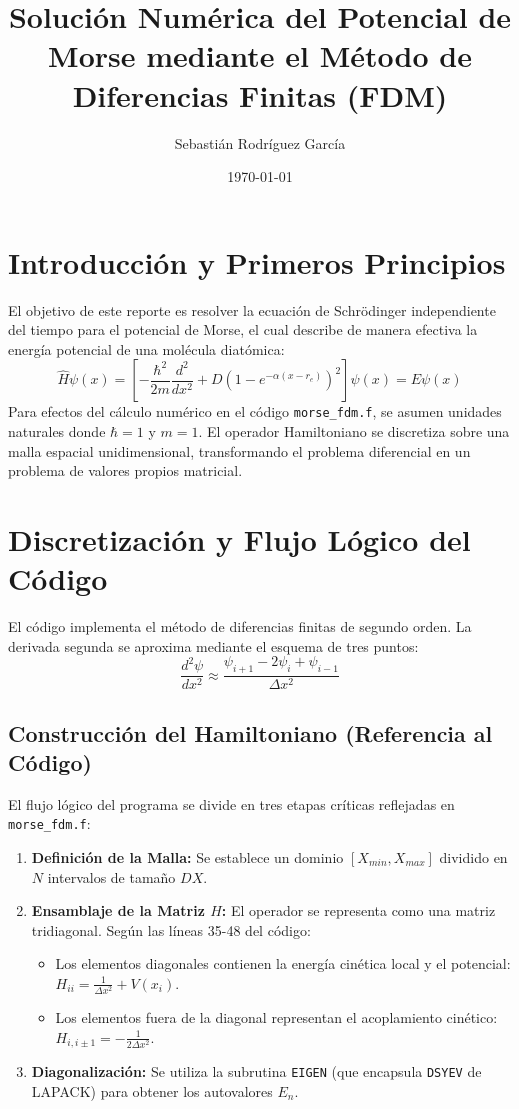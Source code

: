 \documentclass[12pt,a4paper]{article}
\title{Solución Numérica del Potencial de Morse mediante el Método de Diferencias Finitas (FDM)}
\author{Sebastián Rodríguez García}
\date{\today}
\begin{document}
\maketitle

\section{Introducción y Primeros Principios}
El objetivo de este reporte es resolver la ecuación de Schrödinger independiente del tiempo para el potencial de Morse, el cual describe de manera efectiva la energía potencial de una molécula diatómica:
\begin{equation}
\hat{H}\psi(x) = \left[ -\frac{\hbar^2}{2m}\frac{d^2}{dx^2} + D(1 - e^{-\alpha(x-r_e)})^2 \right]\psi(x) = E\psi(x)
\end{equation}
Para efectos del cálculo numérico en el código \texttt{morse\_fdm.f}, se asumen unidades naturales donde $\hbar = 1$ y $m = 1$. El operador Hamiltoniano se discretiza sobre una malla espacial unidimensional, transformando el problema diferencial en un problema de valores propios matricial.

\section{Discretización y Flujo Lógico del Código}
El código implementa el método de diferencias finitas de segundo orden. La derivada segunda se aproxima mediante el esquema de tres puntos:
\begin{equation}
\frac{d^2\psi}{dx^2} \approx \frac{\psi_{i+1} - 2\psi_i + \psi_{i-1}}{\Delta x^2}
\end{equation}

\subsection{Construcción del Hamiltoniano (Referencia al Código)}
El flujo lógico del programa se divide en tres etapas críticas reflejadas en \texttt{morse\_fdm.f}:

\begin{enumerate}
    \item \textbf{Definición de la Malla:} Se establece un dominio $[X_{min}, X_{max}]$ dividido en $N$ intervalos de tamaño $DX$.
    \item \textbf{Ensamblaje de la Matriz $H$:} El operador se representa como una matriz tridiagonal. Según las líneas 35-48 del código:
    \begin{itemize}
        \item Los elementos diagonales contienen la energía cinética local y el potencial: $H_{ii} = \frac{1}{\Delta x^2} + V(x_i)$.
        \item Los elementos fuera de la diagonal representan el acoplamiento cinético: $H_{i, i\pm 1} = -\frac{1}{2\Delta x^2}$.
    \end{itemize}
    \item \textbf{Diagonalización:} Se utiliza la subrutina \texttt{EIGEN} (que encapsula \texttt{DSYEV} de LAPACK) para obtener los autovalores $E_n$.
\end{enumerate}
\end{document}
